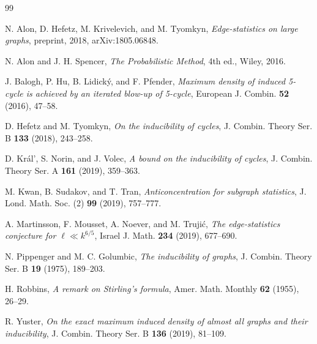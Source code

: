 \begin{thebibliography}{99}

 N. Alon, D. Hefetz, M. Krivelevich, and M. Tyomkyn, \textit{Edge-statistics on large graphs}, preprint, 2018, arXiv:1805.06848.

 N. Alon and J. H. Spencer, \textit{The Probabilistic Method}, 4th ed., Wiley, 2016.

  J. Balogh, P. Hu, B. Lidick\'{y}, and F. Pfender, \textit{Maximum density of induced 5-cycle is achieved by an iterated blow-up of 5-cycle}, European J. Combin. \textbf{52} (2016), 47--58.

 D. Hefetz and M. Tyomkyn, \textit{
On the inducibility of cycles}, J. Combin. Theory Ser. B \textbf{133} (2018), 243--258.

 D. Kr\'{a}l', S. Norin, and J. Volec, \textit{A bound on the inducibility of cycles}, J. Combin. Theory Ser. A \textbf{161} (2019), 359--363.

 M. Kwan, B. Sudakov, and T. Tran, \textit{ Anticoncentration for subgraph statistics}, J. Lond. Math. Soc. (2) \textbf{99} (2019), 757--777.

 A. Martinsson, F. Mousset, A. Noever, and M. Truji\'c, \textit{The edge-statistics conjecture for $\ell\ll k^{6/5}$}, Israel J. Math. \textbf{234} (2019), 677--690.

 N. Pippenger and M. C. Golumbic, \textit{The inducibility of graphs},  J. Combin. Theory Ser. B \textbf{19} (1975), 189--203.

 H. Robbins, \textit{A remark on Stirling's formula}, Amer. Math. Monthly \textbf{62} (1955), 26--29. 

 R. Yuster, \textit{On the exact maximum induced density of almost all graphs and their inducibility}, J. Combin. Theory Ser. B \textbf{ 136} (2019), 81--109.

\end{thebibliography}